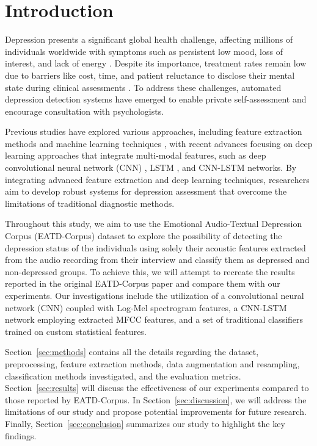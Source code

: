 
\section{Introduction}

Depression presents a significant global health challenge, affecting millions of individuals worldwide with symptoms such as persistent low mood, loss of interest, and lack of energy \cite{peveler2002depression, wu2020using}. Despite its importance, treatment rates remain low due to barriers like cost, time, and patient reluctance to disclose their mental state during clinical assessments \cite{kessler2012costs}. To address these challenges, automated depression detection systems have emerged to enable private self-assessment and encourage consultation with psychologists.

Previous studies have explored various approaches, including feature extraction methods and machine learning techniques \cite{sun2017random, yang2016decision, gong2017topic}, with recent advances focusing on deep learning approaches that integrate multi-modal features, such as deep convolutional neural network (CNN) \cite{yang2017multimodal}, LSTM \cite{al2018detecting}, and CNN-LSTM \cite{ma2016depaudionet} networks. By integrating advanced feature extraction and deep learning techniques, researchers aim to develop robust systems for depression assessment that overcome the limitations of traditional diagnostic methods.

Throughout this study, we aim to use the Emotional Audio-Textual Depression Corpus (EATD-Corpus) \cite{shen2022automatic} dataset to explore the possibility of detecting the depression status of the individuals using solely their acoustic features extracted from the audio recording from their interview and classify them as depressed and non-depressed groups. To achieve this, we will attempt to recreate the results reported in the original EATD-Corpus paper and compare them with our experiments. Our investigations include the utilization of a convolutional neural network (CNN) coupled with Log-Mel spectrogram features, a CNN-LSTM network employing extracted MFCC features, and a set of traditional classifiers trained on custom statistical features.

Section~\ref{sec:methods} contains all the details regarding the dataset, preprocessing, feature extraction methods, data augmentation and resampling, classification methods investigated, and the evaluation metrics. Section~\ref{sec:results} will discuss the effectiveness of our experiments compared to those reported by EATD-Corpus. In Section~\ref{sec:discussion}, we will address the limitations of our study and propose potential improvements for future research. Finally, Section~\ref{sec:conclusion} summarizes our study to highlight the key findings.